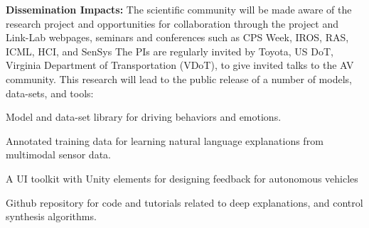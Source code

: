 \newline
\noindent \textbf{Dissemination Impacts:}
The scientific community will be made aware of the research project and opportunities for collaboration through the project and Link-Lab webpages, seminars and conferences such as CPS Week, IROS, RAS, ICML, HCI, and SenSys
The PIs are regularly invited by Toyota, US DoT, Virginia Department of Transportation (VDoT), to give invited talks to the AV community.
This research will lead to the public release of a number of models, data-sets, and tools:
\begin{enumerate*}
    \item Model and data-set library for driving behaviors and emotions. 
    \item Annotated training data for learning natural language explanations from multimodal sensor data.
    \item A UI toolkit with Unity elements for designing feedback for autonomous vehicles
    \item Github repository for code and tutorials related to deep explanations, and control synthesis algorithms. 
\end{enumerate*}

